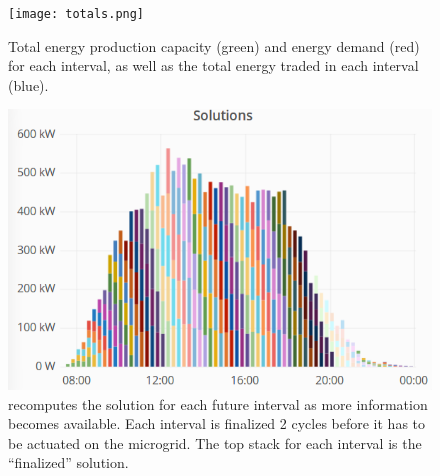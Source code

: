 \begin{figure}[t]
    \centering
    \texttt{[image: totals.png]}
    \caption{Total energy production capacity (green) and energy demand (red) for each interval, as well as the total energy traded in each interval (blue).}
    \label{fig:totals}
\end{figure}

\ifExtended
\begin{figure}[t]
\centering
    \includegraphics[width=0.95\linewidth]{figs/MultipleSolutions_white.png}
    \caption{\Platform recomputes the  solution for each future interval as more information becomes available. Each interval is finalized 2 cycles before it has to be actuated on the microgrid. The top stack for each interval is the ``finalized'' solution.}
    \label{fig:MultipleSolutions}
 
\end{figure}
 \fi 
 \ifExtended
 
